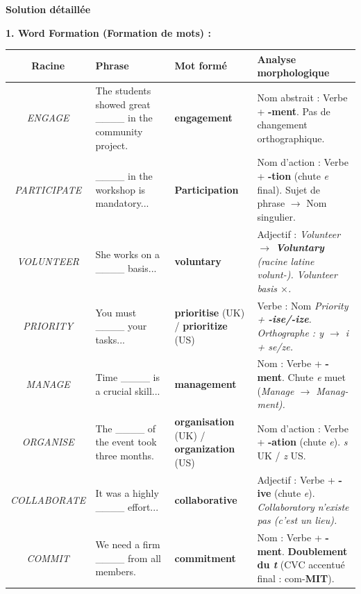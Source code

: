 \documentclass[11pt]{article}
\newcommand{\eng}[1]{\ifmmode\text{\textit{#1}}\else\begingroup\selectlanguage{english}\itshape #1\endgroup\fi}
\begin{document}
\begin{exoresolu}
\tcblower

\textbf{Solution détaillée}

\textbf{1. Word Formation (Formation de mots) :}

\begin{center}
\begin{tabularx}{\linewidth}{|c|X|X|X|}\hline
\rowcolor{poppurpleL} \textbf{Racine} & \textbf{Phrase} & \textbf{Mot formé} & \textbf{Analyse morphologique} \\ \hline
\eng{ENGAGE} & The students showed great \_\_\_\_ in the community project. & \textbf{engagement} & Nom abstrait : Verbe + \textbf{-ment}. Pas de changement orthographique. \\ \hline
\eng{PARTICIPATE} & \_\_\_\_ in the workshop is mandatory... & \textbf{Participation} & Nom d'action : Verbe + \textbf{-tion} (chute \textit{e} final). Sujet de phrase $\rightarrow$ Nom singulier. \\ \hline
\eng{VOLUNTEER} & She works on a \_\_\_\_ basis... & \textbf{voluntary} & Adjectif : \eng{Volunteer} $\rightarrow$ \textbf{Voluntary} (racine latine \textit{volunt-}). \eng{Volunteer basis} $\times$. \\ \hline
\eng{PRIORITY} & You must \_\_\_\_ your tasks... & \textbf{prioritise} (UK) / \textbf{prioritize} (US) & Verbe : Nom \eng{Priority} + \textbf{-ise/-ize}. Orthographe : \textit{y} $\rightarrow$ \textit{i} + \textit{se/ze}. \\ \hline
\eng{MANAGE} & Time \_\_\_\_ is a crucial skill... & \textbf{management} & Nom : Verbe + \textbf{-ment}. Chute \textit{e} muet (\eng{Manage} $\rightarrow$ \eng{Manag-ment}). \\ \hline
\eng{ORGANISE} & The \_\_\_\_ of the event took three months. & \textbf{organisation} (UK) / \textbf{organization} (US) & Nom d'action : Verbe + \textbf{-ation} (chute \textit{e}). \textit{s} UK / \textit{z} US. \\ \hline
\eng{COLLABORATE} & It was a highly \_\_\_\_ effort... & \textbf{collaborative} & Adjectif : Verbe + \textbf{-ive} (chute \textit{e}). \eng{Collaboratory} n'existe pas (c'est un lieu). \\ \hline
\eng{COMMIT} & We need a firm \_\_\_\_ from all members. & \textbf{commitment} & Nom : Verbe + \textbf{-ment}. \textbf{Doublement du \textit{t}} (CVC accentué final : com-\textbf{MIT}). \\ \hline
\end{tabularx}
\end{center}


\end{exoresolu}
\end{document}
